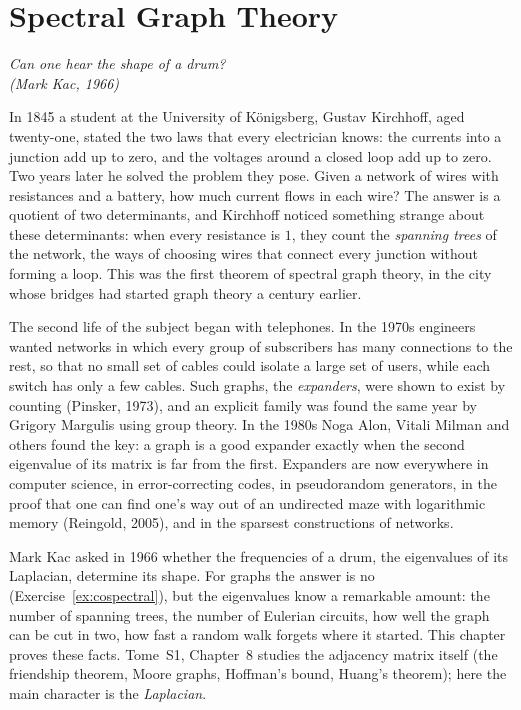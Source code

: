 \chapter{Spectral Graph Theory}

\begin{center}\itshape
Can one hear the shape of a drum?\\
\upshape(Mark Kac, 1966)
\end{center}

In 1845 a student at the University of K\"onigsberg, Gustav Kirchhoff, aged twenty-one, stated the two laws that every
electrician knows: the currents into a junction add up to zero, and the voltages around a closed loop add up to zero. Two
years later he solved the problem they pose. Given a network of wires with resistances and a battery, how much current
flows in each wire? The answer is a quotient of two determinants, and Kirchhoff noticed something strange about these
determinants: when every resistance is $1$, they count the \emph{spanning trees} of the network, the ways of choosing
wires that connect every junction without forming a loop. This was the first theorem of spectral graph theory, in the city
whose bridges had started graph theory a century earlier.

The second life of the subject began with telephones. In the 1970s engineers wanted networks in which every group of
subscribers has many connections to the rest, so that no small set of cables could isolate a large set of users, while
each switch has only a few cables. Such graphs, the \emph{expanders}, were shown to exist by counting (Pinsker, 1973), and an
explicit family was found the same year by Grigory Margulis using group theory. In the 1980s Noga Alon, Vitali Milman and
others found the key: a graph is a good expander exactly when the second eigenvalue of its matrix is far from the first.
Expanders are now everywhere in computer science, in error-correcting codes, in pseudorandom generators, in the
proof that one can find one's way out of an undirected maze with logarithmic memory (Reingold, 2005), and in the
sparsest constructions of networks.

Mark Kac asked in 1966 whether the frequencies of a drum, the eigenvalues of its Laplacian, determine its shape. For
graphs the answer is no (Exercise~\ref{ex:cospectral}), but the eigenvalues know a remarkable amount: the number of spanning
trees, the number of Eulerian circuits, how well the graph can be cut in two, how fast a random walk forgets where it started.
This chapter proves these facts. Tome~S1, Chapter~8 studies the adjacency matrix itself (the friendship theorem, Moore graphs,
Hoffman's bound, Huang's theorem); here the main character is the \emph{Laplacian}.


